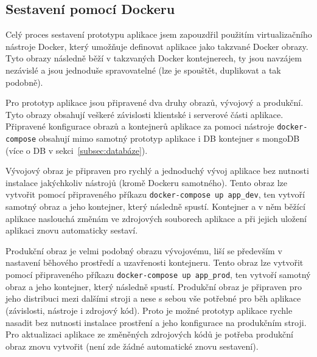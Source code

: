 \subsection{Sestavení pomocí Dockeru}\label{subsec:sestaveníPomocíDockeru}

Celý proces sestavení prototypu aplikace jsem zapouzdřil použitím virtualizačního nástroje Docker, který umožňuje definovat aplikace jako takzvané Docker obrazy.
Tyto obrazy následně běží v takzvaných Docker kontejnerech, ty jsou navzájem nezávislé a jsou jednoduše spravovatelné (lze je spouštět, duplikovat a tak podobně).

Pro prototyp aplikace jsou připravené dva druhy obrazů, vývojový a produkční.
Tyto obrazy obsahují veškeré závislosti klientské i serverové části aplikace.
Připravené konfigurace obrazů a kontejnerů aplikace za pomoci nástroje \texttt{docker-compose} obsahují mimo samotný prototyp aplikace i DB kontejner s mongoDB (více o DB v sekci~\ref{subsec:databáze}).

Vývojový obraz je připraven pro rychlý a jednoduchý vývoj aplikace bez nutnosti instalace jakýchkoliv nástrojů (kromě Dockeru samotného).
Tento obraz lze vytvořit pomocí připraveného příkazu \texttt{docker-compose up app_dev}, ten vytvoří samotný obraz a jeho kontejner, který následně spustí.
Kontejner a v něm běžící aplikace naslouchá změnám ve zdrojových souborech aplikace a při jejich uložení aplikaci znovu automaticky sestaví.

Produkční obraz je velmi podobný obrazu vývojovému, liší se především v nastavení běhového prostředí a uzavřenosti kontejneru.
Tento obraz lze vytvořit pomocí připraveného příkazu \texttt{docker-compose up app_prod}, ten vytvoří samotný obraz a jeho kontejner, který následně spustí.
Produkční obraz je připraven pro jeho distribuci mezi dalšími stroji a nese s sebou vše potřebné pro běh aplikace (závislosti, nástroje i zdrojový kód).
Proto je možné prototyp aplikace rychle nasadit bez nutnosti instalace prostření a jeho konfigurace na produkčním stroji.
Pro aktualizaci aplikace ze změněných zdrojových kódů je potřeba produkční obraz znovu vytvořit (není zde žádné automatické znovu sestavení).
